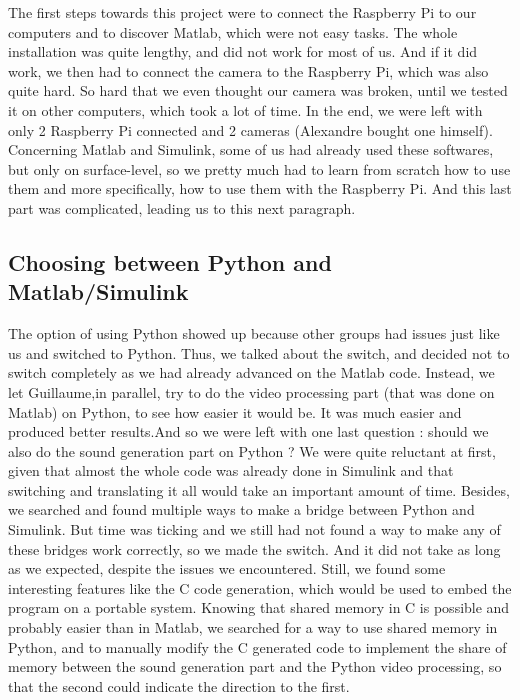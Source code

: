 \documentclass{rapport}
\begin{document}
The first steps towards this project were to connect the Raspberry Pi to our computers and to discover Matlab, which were not easy tasks.
The whole installation was quite lengthy, and did not work for most of us. And if it did work, we then had to connect the camera to the Raspberry Pi, which was also quite hard. So hard that we even thought our camera was broken, until we tested it on other computers, which took a lot of time. In the end, we were left with only 2 Raspberry Pi connected and 2 cameras (Alexandre bought one himself).
Concerning Matlab and Simulink, some of us had already used these softwares, but only on surface-level, so we pretty much had to learn from scratch how to use them and more specifically, how to use them with the Raspberry Pi. And this last part was complicated, leading us to this next paragraph.

\subsection{Choosing between Python and Matlab/Simulink
}

The option of using Python showed up because other groups had issues just like us and switched to Python. Thus, we talked about the switch, and decided not to switch completely as we had already advanced on the Matlab code. Instead, we let Guillaume,in parallel, try to do the video processing part (that was done on Matlab) on Python, to see how easier it would be.
It was much easier and produced better results.And so we were left with one last question : should we also do the sound generation part on Python ?
We were quite reluctant at first, given that almost the whole code was already done in Simulink and that switching and translating it all would take an important amount of time. Besides, we searched and found multiple ways to make a bridge between Python and Simulink. But time was ticking and we still had not found a way to make any of these bridges work correctly, so we made the switch. And it did not take as long as we expected, despite the issues we encountered. 
Still, we found some interesting features like the C code generation, which would be used to embed the program on a portable system. Knowing that shared memory in C is possible and probably easier than in Matlab, we searched for a way to use shared memory in Python, and to manually modify the C generated code to implement the share of memory between the sound generation part and the Python video processing, so that the second could indicate the direction to the first.
\end{document}
